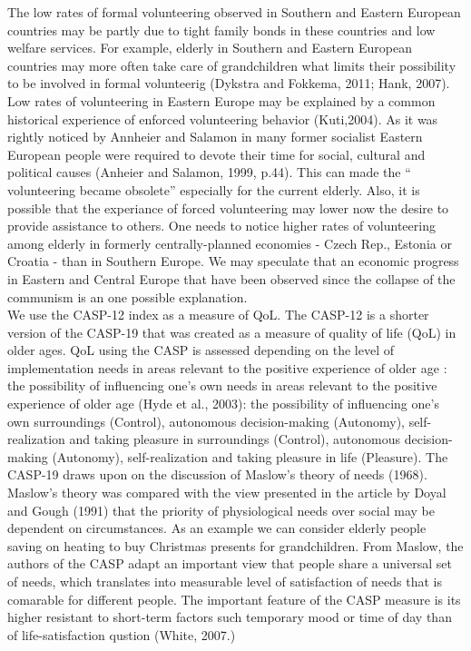 \documentclass[10pt, letterpaper]{article}
\begin{document}
\begin{spacing}{1.4}
The low rates of formal volunteering observed in Southern and Eastern European countries may be partly due to tight family bonds in these countries and low welfare services. For example, elderly in Southern and Eastern European countries may more often take care of grandchildren what limits their possibility to be involved in formal volunteerig (Dykstra and Fokkema, 2011; Hank, 2007). Low rates of volunteering in Eastern Europe may be explained by a common historical experience of  enforced volunteering behavior (Kuti,2004). As it was rightly noticed by Annheier and Salamon in
many former socialist Eastern European people were required to devote their time for social, cultural and political causes (Anheier and Salamon, 1999, p.44). This can made the “ volunteering became obsolete” especially for the current elderly. Also, it is possible that the experiance of forced volunteering  may lower now the desire to provide assistance to others. One needs to notice higher rates of volunteering among elderly  in  formerly centrally-planned economies - Czech Rep., Estonia or Croatia - than in Southern Europe. We may speculate that an economic progress in Eastern and Central Europe that have been observed since the collapse of the communism is an one possible explanation. \\

We use the CASP-12 index as a measure of QoL. The CASP-12 is a shorter version of the CASP-19 that was created as a measure of quality of life (QoL) in older ages. QoL using the CASP is assessed depending on the level of implementation needs in areas relevant to the positive experience of older age \cite{hyde03}: the possibility of influencing one's own	 needs in areas relevant to the positive experience of older age (Hyde et al., 2003): the possibility of influencing one's own  surroundings (Control), autonomous decision-making (Autonomy), self-realization and taking pleasure in	surroundings (Control), autonomous decision-making (Autonomy), self-realization and taking pleasure in  life (Pleasure). The CASP-19 draws upon on the discussion of Maslow's theory of needs (1968)\citep{borrat15}. Maslow's theory was compared with the view presented in the article by Doyal and Gough
(1991) that the priority of physiological needs over social may be dependent on circumstances.  As an example we can consider elderly people saving on heating to buy Christmas presents for grandchildren. From Maslow, the authors of the CASP adapt an important view that people share a universal set of needs, which translates into measurable level of satisfaction of needs that is comarable for different people. The important feature of the CASP measure is its higher resistant to short-term factors such temporary mood or time of day than of life-satisfaction qustion (White, 2007.) \\



\end{spacing}
\end{document}
